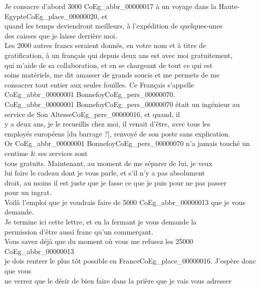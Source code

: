 \documentclass{book}
\begin{document}
\indent Je consacre d’abord 3000 \gls{CoEg_abbr_00000017} à un voyage dans la Haute-Egypte\gls{CoEg_place_00000020}, et\\
quand les temps deviendront meilleurs, à l’expédition de quelques-unes\\
des caisses que je laisse derrière moi.\\
\indent Les 2000 autres francs seraient donnés, en votre nom et à titre de\\
gratification, à un français qui depuis deux ans est avec moi gratuitement,\\
qui m’aide de sa collaboration, et en se chargeant de tout ce qui est\\
soins matériels, me dit amasser de grands soucis et me permets de me\\
consacrer tout entier aux seules fouilles. Ce Français s’appelle \gls{CoEg_abbr_00000001} Bonnefoy\gls{CoEg_pers_00000070}.\\
\gls{CoEg_abbr_00000001} Bonnefoy\gls{CoEg_pers_00000070} était un ingénieur au service de Son Altesse\gls{CoEg_pers_00000016}, et quand, il\\
y a deux ans, je le recueillis chez moi, il venait d’être, avec tous les\\
employés européens {[du barrage ?]}, renvoyé de son poste sans explication.\\
Or \gls{CoEg_abbr_00000001} Bonnefoy\gls{CoEg_pers_00000070} n’a jamais touché un centime \& ses services sont\\
tous gratuits. Maintenant, au moment de me séparer de lui, je veux\\
lui faire le cadeau dont je vous parle, et s’il n’y a pas absolument\\
droit, au moins il est juste que je fasse ce que je puis pour ne pas passer\\
pour un ingrat.\\
\indent Voilà l’emploi que je voudrais faire de 5000 \gls{CoEg_abbr_00000013} que je vous demande.\\
\indent Je termine ici cette lettre, et en la fermant je vous demande la\\
permission d’être aussi franc qu’un commerçant.\\
\indent Vous savez déjà que du moment où vous me refusez les 25000 \gls{CoEg_abbr_00000013}\\
je dois rentrer le plus tôt possible en France\gls{CoEg_place_00000016}. J’espère donc que vous\\
ne verrez que le désir de bien faire dans la prière que je vais vous adresser
\end{document}

